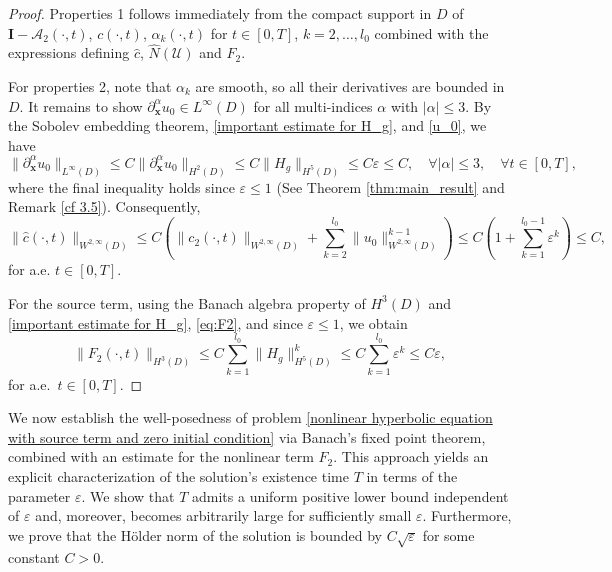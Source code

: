 \documentclass[11pt,reqno,oneside]{amsart}
\numberwithin{equation}{section}
\theoremstyle{definition}
\theoremstyle{remark}
\numberwithin{equation}{section}
\begin{document}
	\begin{proof}
		Properties 1 follows immediately from the compact support in $D$ of $\mathbf{I} - \mathscr{A}_2(\cdot, t)$, $c(\cdot, t)$, $\alpha_k(\cdot, t)$ for $t \in [0, T]$, $k = 2, \dots, l_0$ combined with the expressions defining $\hat{c}$, $\hat{N}(\mathscr{U})$ and $F_2$.
		
		For properties 2, note that $\alpha_k$ are smooth, so all their derivatives are bounded in $D$. It remains to show $\partial_{\mathbf{x}}^{\alpha} u_0 \in L^{\infty}(D)$ for all multi-indices $\alpha$ with $|\alpha| \leqslant 3$. By the Sobolev embedding theorem, \eqref{important estimate for H_g}, and \eqref{u_0}, we have
		\begin{equation}\label{5.2}
			\|\partial_{\mathbf{x}}^{\alpha} u_0\|_{L^{\infty}(D)} \leqslant C \|\partial_{\mathbf{x}}^{\alpha} u_0\|_{H^{2}(D)} \leqslant C \|H_g\|_{H^5(D)} \leqslant C \varepsilon \leqslant C, \quad \forall |\alpha| \leqslant 3, \quad \forall t \in [0, T],
		\end{equation}
		where the final inequality holds since $\varepsilon \leqslant 1$ (See Theorem \ref{thm:main_result} and Remark \ref{cf 3.5}). Consequently,
		\begin{equation*}
			\|\hat{c}(\cdot, t)\|_{W^{2,\infty}(D)}\leqslant  C \left( \|c_2(\cdot, t)\|_{W^{2,\infty}(D)} + \sum_{k=2}^{l_0} \|u_0\|_{W^{2,\infty}(D)}^{k-1} \right) \leqslant C \left( 1 + \sum_{k=1}^{l_0-1} \varepsilon^{k} \right) \leqslant C,
		\end{equation*}
		for a.e. $t \in [0, T]$.
		
		For the source term, using the Banach algebra property of $H^3(D)$ and
	\eqref{important estimate for H_g}, \eqref{eq:F2}, and since $\varepsilon\le1$,
	we obtain
	\begin{equation}\label{eq:F2_est}
		\|F_2(\cdot,t)\|_{H^3(D)} \le C\sum_{k=1}^{l_0}\|H_g\|_{H^5(D)}^k
		\le C\sum_{k=1}^{l_0}\varepsilon^k \le C\varepsilon,
	\end{equation}
	for a.e.\ $t\in[0,T]$.
	\end{proof}
	
	We now establish the well-posedness of problem \eqref{nonlinear hyperbolic equation with source term and zero initial condition} via Banach's fixed point theorem, combined with an estimate for the nonlinear term $F_2$. This approach yields an explicit characterization of the solution's existence time $T$ in terms of the parameter $\varepsilon$. We show that $T$ admits a uniform positive lower bound independent of $\varepsilon$ and, moreover, becomes arbitrarily large for sufficiently small $\varepsilon$. Furthermore, we prove that the Hölder norm of the solution is bounded by $C \sqrt{\varepsilon}$ for some constant $C > 0$.
	
\end{document}

